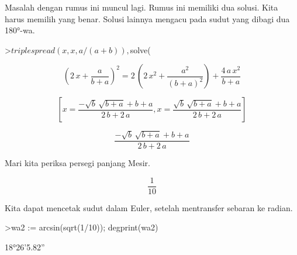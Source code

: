 \documentclass[a4paper,10pt]{article}
\begin{document}
\begin{eulernotebook}
\begin{eulercomment}
\begin{eulercomment}
\begin{eulercomment}
\begin{eulercomment}
\begin{eulercomment}
\begin{eulercomment}
\begin{eulercomment}
\begin{eulercomment}
\begin{eulercomment}
\begin{eulercomment}
\begin{eulercomment}
\begin{eulercomment}
\begin{eulercomment}
\begin{eulercomment}
\begin{eulercomment}
\begin{eulercomment}
\begin{eulercomment}
\begin{eulercomment}
\begin{eulercomment}
\begin{eulercomment}
\begin{eulercomment}
\begin{eulercomment}
\begin{eulercomment}
\begin{eulercomment}
\begin{eulercomment}
\begin{eulercomment}
\begin{eulercomment}
\begin{eulercomment}
\begin{eulercomment}
\begin{eulercomment}
\begin{eulercomment}
\begin{eulercomment}
\begin{eulercomment}
Masalah dengan rumus ini muncul lagi. Rumus ini memiliki dua solusi.
Kita harus memilih yang benar. Solusi lainnya mengacu pada sudut yang
dibagi dua 180°-wa.
\end{eulercomment}
\begin{eulerprompt}
>$triplespread(x,x,a/(a+b)), $solve(%
\end{eulerprompt}
\begin{eulerformula}
\[
\left(2\,x+\frac{a}{b+a}\right)^2=2\,\left(2\,x^2+\frac{a^2}{\left(
 b+a\right)^2}\right)+\frac{4\,a\,x^2}{b+a}
\]
\end{eulerformula}
\begin{eulerformula}
\[
\left[ x=\frac{-\sqrt{b}\,\sqrt{b+a}+b+a}{2\,b+2\,a} , x=\frac{
 \sqrt{b}\,\sqrt{b+a}+b+a}{2\,b+2\,a} \right] 
\]
\end{eulerformula}
\begin{eulerformula}
\[
\frac{-\sqrt{b}\,\sqrt{b+a}+b+a}{2\,b+2\,a}
\]
\end{eulerformula}
\begin{eulercomment}
Mari kita periksa persegi panjang Mesir.
\end{eulercomment}
\begin{eulerformula}
\[
\frac{1}{10}
\]
\end{eulerformula}
\begin{eulercomment}
Kita dapat mencetak sudut dalam Euler, setelah mentransfer sebaran ke
radian.
\end{eulercomment}
\begin{eulerprompt}
>wa2 := arcsin(sqrt(1/10)); degprint(wa2)
\end{eulerprompt}
\begin{euleroutput}
  18°26'5.82''
\end{euleroutput}

\end{eulercomment}
\end{eulercomment}
\end{eulercomment}
\end{eulercomment}
\end{eulercomment}
\end{eulercomment}
\end{eulercomment}
\end{eulercomment}
\end{eulercomment}
\end{eulercomment}
\end{eulercomment}
\end{eulercomment}
\end{eulercomment}
\end{eulercomment}
\end{eulercomment}
\end{eulercomment}
\end{eulercomment}
\end{eulercomment}
\end{eulercomment}
\end{eulercomment}
\end{eulercomment}
\end{eulercomment}
\end{eulercomment}
\end{eulercomment}
\end{eulercomment}
\end{eulercomment}
\end{eulercomment}
\end{eulercomment}
\end{eulercomment}
\end{eulercomment}
\end{eulercomment}
\end{eulercomment}
\end{eulernotebook}
\end{document}

